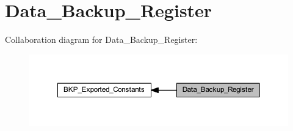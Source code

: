 \hypertarget{group___data___backup___register}{}\section{Data\+\_\+\+Backup\+\_\+\+Register}
\label{group___data___backup___register}
Collaboration diagram for Data\+\_\+\+Backup\+\_\+\+Register\+:
\nopagebreak
\begin{figure}[H]
\begin{center}
\leavevmode
\includegraphics[width=350pt]{group___data___backup___register}
\end{center}
\end{figure}
